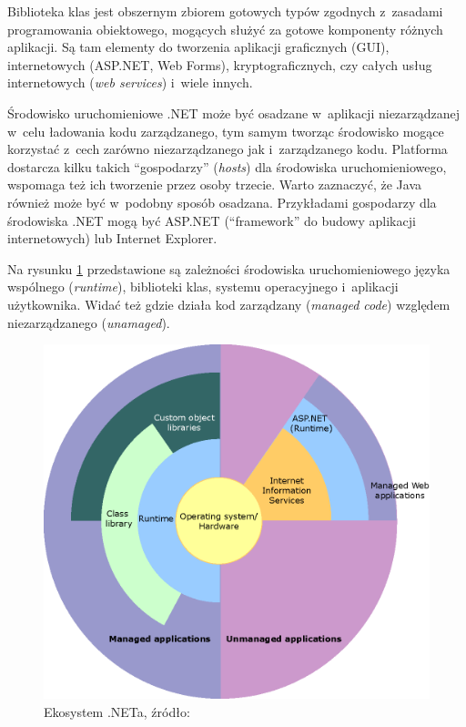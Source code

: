 Biblioteka klas jest obszernym zbiorem gotowych typów zgodnych z~zasadami programowania obiektowego, mogących służyć za gotowe komponenty różnych aplikacji. Są tam elementy do tworzenia aplikacji graficznych (GUI), internetowych (ASP.NET, Web Forms), kryptograficznych, czy całych usług internetowych (\emph{web services}) i~wiele innych.

Środowisko uruchomieniowe .NET może być osadzane w~aplikacji niezarządzanej w~celu ładowania kodu zarządzanego, tym samym tworząc środowisko mogące korzystać z~cech zarówno niezarządzanego jak i~zarządzanego kodu. Platforma dostarcza kilku takich ``gospodarzy'' (\emph{hosts}) dla środowiska uruchomieniowego, wspomaga też ich tworzenie przez osoby trzecie.
Warto zaznaczyć, że Java również może być w~podobny sposób osadzana.
Przykładami gospodarzy dla środowiska .NET mogą być ASP.NET (``framework'' do budowy aplikacji internetowych) lub Internet Explorer.

Na rysunku \ref{fig:dotnet-ecosystem} przedstawione są zależności środowiska uruchomieniowego języka wspólnego (\emph{runtime}), biblioteki klas, systemu operacyjnego i~aplikacji użytkownika. Widać też gdzie działa kod zarządzany (\emph{managed code}) względem niezarządzanego (\emph{unamaged}).

\begin{figure}
	\centering
		\includegraphics[scale=0.6]{img/dotnet-ecosystem.png}
	\caption{Ekosystem .NETa, źródło: \cite{dotnetoverview}}
	\label{fig:dotnet-ecosystem}
\end{figure}

